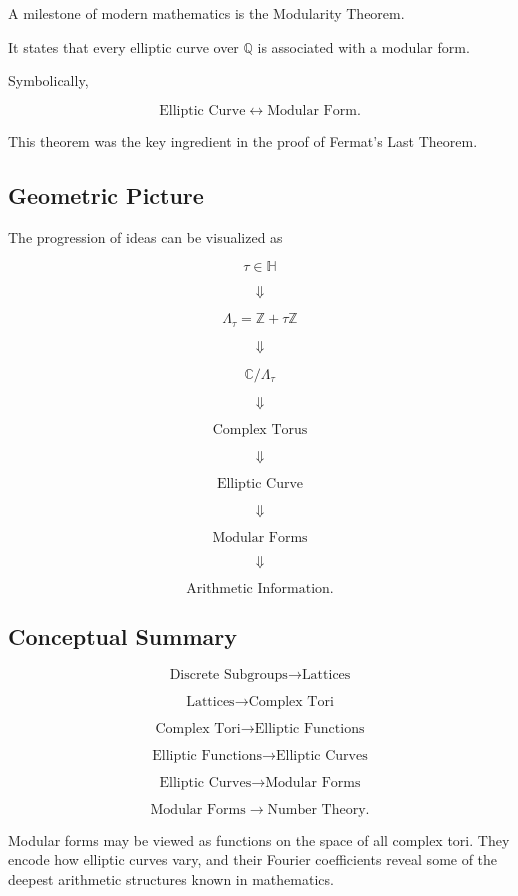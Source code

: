 \documentclass[12pt,a4paper]{article}
\theoremstyle{notespace}
\begin{document}
A milestone of modern mathematics is the Modularity Theorem.

It states that every elliptic curve over \(\mathbb Q\) is associated with a modular form.

Symbolically,

\[
\text{Elliptic Curve}
\longleftrightarrow
\text{Modular Form}.
\]

This theorem was the key ingredient in the proof of Fermat's Last Theorem.

\subsection{Geometric Picture}

The progression of ideas can be visualized as

\[
\tau\in\mathbb H
\]

\[
\Downarrow
\]

\[
\Lambda_\tau
=
\mathbb Z+\tau\mathbb Z
\]

\[
\Downarrow
\]

\[
\mathbb C/\Lambda_\tau
\]

\[
\Downarrow
\]

\[
\text{Complex Torus}
\]

\[
\Downarrow
\]

\[
\text{Elliptic Curve}
\]

\[
\Downarrow
\]

\[
\text{Modular Forms}
\]

\[
\Downarrow
\]

\[
\text{Arithmetic Information}.
\]

\subsection{Conceptual Summary}

\[
\text{Discrete Subgroups}
\longrightarrow
\text{Lattices}
\]

\[
\text{Lattices}
\longrightarrow
\text{Complex Tori}
\]

\[
\text{Complex Tori}
\longrightarrow
\text{Elliptic Functions}
\]

\[
\text{Elliptic Functions}
\longrightarrow
\text{Elliptic Curves}
\]

\[
\text{Elliptic Curves}
\longrightarrow
\text{Modular Forms}
\]

\[
\text{Modular Forms}
\longrightarrow
\text{Number Theory}.
\]

Modular forms may be viewed as functions on the space of all complex tori. They encode how elliptic curves vary, and their Fourier coefficients reveal some of the deepest arithmetic structures known in mathematics.
\end{document}
